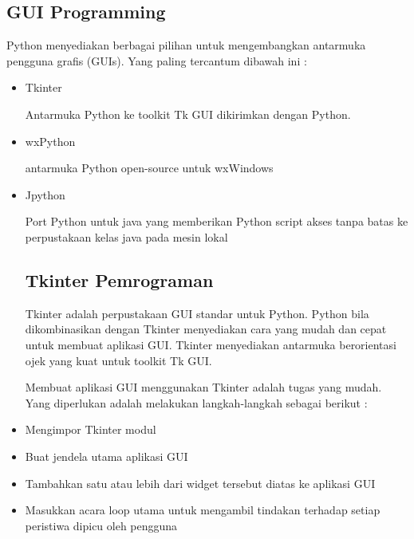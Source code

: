 \documentclass{wileySix}
\begin{document}
\begin{myEnumerate}
{\chapter{GUI Programming}
\par
\vspace{12pt}
Python menyediakan berbagai pilihan untuk mengembangkan antarmuka pengguna grafis (GUIs). Yang paling tercantum dibawah ini : \par
\noindent 
\begin{itemize}
	\item Tkinter \par
	Antarmuka Python ke toolkit Tk GUI dikirimkan dengan Python.  \par
	\noindent 
	\item wxPython \par
	antarmuka Python open-source untuk wxWindows \par
	\noindent 
	\item Jpython \par
	Port Python untuk java yang memberikan Python script akses tanpa batas ke perpustakaan kelas java pada mesin lokal \par
	\vspace{12pt}
	\noindent 
	
\section{Tkinter Pemrograman}
\par
Tkinter adalah perpustakaan GUI standar untuk Python. Python bila dikombinasikan dengan Tkinter menyediakan cara yang mudah dan cepat untuk membuat aplikasi GUI. Tkinter menyediakan antarmuka berorientasi ojek yang kuat untuk toolkit Tk GUI. \par
\noindent 
\hspace*{0.5in} Membuat aplikasi GUI menggunakan Tkinter adalah tugas yang mudah. Yang diperlukan adalah melakukan langkah-langkah sebagai berikut : \par
\noindent 
\item Mengimpor Tkinter modul \par
\noindent 
\item Buat jendela utama aplikasi GUI \par
\noindent 
\item Tambahkan satu atau lebih dari widget tersebut diatas ke aplikasi GUI \par
\noindent 
\item Masukkan acara loop utama untuk mengambil tindakan terhadap setiap peristiwa dipicu oleh pengguna\end{itemize}
\par
\noindent 


}
\end{myEnumerate}
\end{document}
